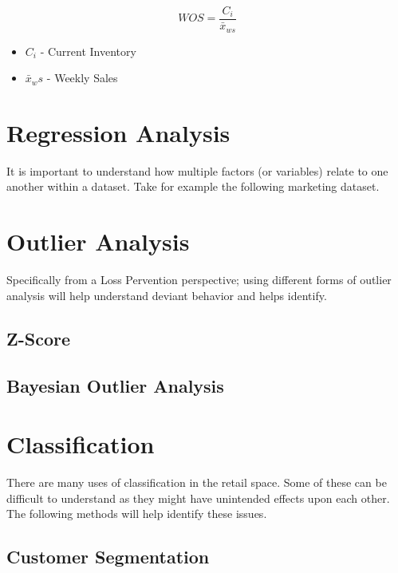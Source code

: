 \documentclass[]{book}
\providecommand{\tightlist}{%
  \setlength{\itemsep}{0pt}\setlength{\parskip}{0pt}}
\theoremstyle{definition}
\theoremstyle{definition}
\theoremstyle{definition}
\theoremstyle{remark}
\begin{document}
\[
WOS = \frac{C_i}{\bar{x}_{ws}}
\]

\begin{itemize}
\tightlist
\item
  \(C_i\) - Current Inventory
\item
  \(\bar{x}_ws\) - Weekly Sales
\end{itemize}

\hypertarget{regression-analysis}{%
\chapter{Regression Analysis}\label{regression-analysis}}

It is important to understand how multiple factors (or variables) relate
to one another within a dataset. Take for example the following
marketing dataset.

\hypertarget{outlier-analysis}{%
\chapter{Outlier Analysis}\label{outlier-analysis}}

Specifically from a Loss Pervention perspective; using different forms
of outlier analysis will help understand deviant behavior and helps
identify.

\hypertarget{z-score}{%
\section{Z-Score}\label{z-score}}

\hypertarget{bayesian-outlier-analysis}{%
\section{Bayesian Outlier Analysis}\label{bayesian-outlier-analysis}}

\hypertarget{classification}{%
\chapter{Classification}\label{classification}}

There are many uses of classification in the retail space. Some of these
can be difficult to understand as they might have unintended effects
upon each other. The following methods will help identify these issues.

\hypertarget{customer-segmentation}{%
\section{Customer Segmentation}\label{customer-segmentation}}
\end{document}
